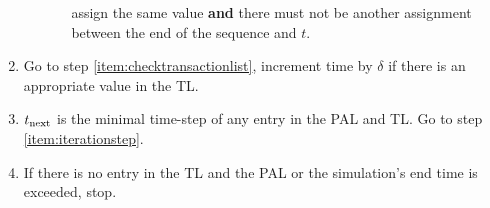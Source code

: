 \begin{enumerate}
\begin{enumerate}
\begin{enumerate}
			assign the same value \textbf{and} there must not be another assignment
			between the end of the sequence and $t$.
		\end{enumerate}
	\end{enumerate}
	\item Go to step \ref{item:checktransactionlist}, increment time by $\delta$ if
	there is an appropriate value in the TL.
	\item $t_{\text{next}}$ is the minimal time-step of any entry in the PAL and TL. Go to
	step \ref{item:iterationstep}.
	\item If there is no entry in the TL and the PAL or the simulation's end time
	is exceeded, stop.
\end{enumerate}


